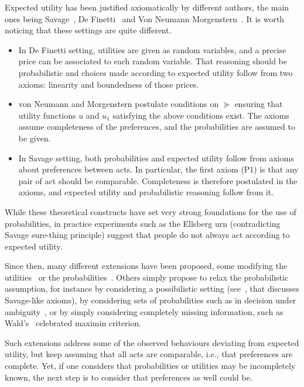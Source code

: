 \documentclass[french, english]{llncs}
\begin{document}
	Expected utility has been justified axiomatically by different authors, the main ones being Savage~\cite{savage_foundations_1972}, De Finetti~\cite{definetti_probability_2017} and Von Neumann Morgenstern~\cite{von_neumann_theory_2004}. It is worth noticing that these settings are quite different.
	\begin{itemize}
		\item In De Finetti setting, utilities are given as random variables, and a precise price can be associated to each random variable. That reasoning should be probabilistic and choices made according to expected utility follow from two axioms: linearity and boundedness of those prices.
		\item von Neumann and Morgenstern postulate conditions on $\succeq$ ensuring that utility functions $u$ and $u_1$ satisfying the above conditions exist. The axioms assume completeness of the preferences, and the probabilities are assumed to be given.
		\item In Savage setting, both probabilities and expected utility follow from axioms about preferences between acts. In particular, the first axiom (P1) is that any pair of act should be comparable. Completeness is therefore postulated in the axioms, and expected utility and probabilistic reasoning follow from it. 
	\end{itemize}
	While these theoretical constructs have set very strong foundations for the use of probabilities, in practice experiments such as the Ellsberg urn (contradicting Savage sure-thing principle) suggest that people do not always act according to expected utility. 
	
	Since then, many different extensions have been proposed, some modifying the utilities~\cite{wakker_prospect_2010} or the probabilities~\cite{quiggin_generalized_2012}. Others simply propose to relax the probabilistic assumption, for instance by considering a possibilistic setting  (see~\cite{dubois_qualitative_2003}, that discusses Savage-like axioms), by considering sets of probabilities such as in decision under ambiguity~\cite{gajdos_attitude_2008}, or by simply considering completely missing information, such as Wald's~\cite{wald_statistical_1992} celebrated maximin criterion. 
	
	Such extensions address some of the observed behaviours deviating from expected utility, but keep assuming that all acts are comparable, i.e., that preferences are complete. Yet, if one considers that probabilities or utilities may be incompletely known, the next step is to consider that preferences as well could be.
	
\end{document}
